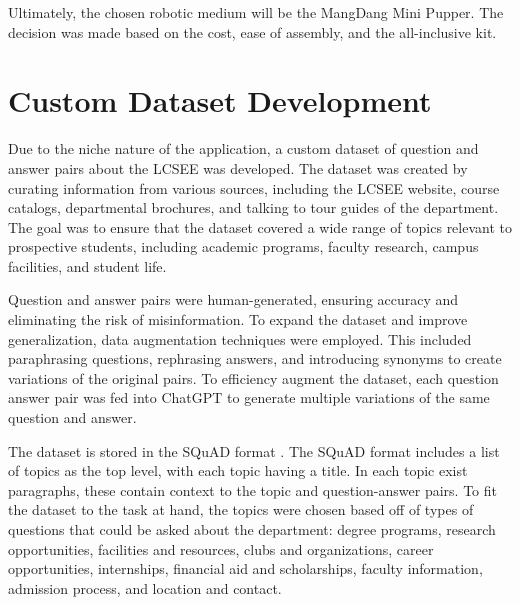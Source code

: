 \documentclass[conference]{IEEEtran}
\begin{document}
Ultimately, the chosen robotic medium will be the MangDang Mini Pupper. 
The decision was made based on the cost, ease of assembly, and the all-inclusive kit.

\section{Custom Dataset Development}
Due to the niche nature of the application, a custom dataset of question and answer pairs about the LCSEE was developed.
The dataset was created by curating information from various sources, including the LCSEE website, course catalogs, departmental brochures, and talking to tour guides of the department. 
The goal was to ensure that the dataset covered a wide range of topics relevant to prospective students, including academic programs, faculty research, campus facilities, and student life.

Question and answer pairs were human-generated, ensuring accuracy and eliminating the risk of misinformation.
To expand the dataset and improve generalization, data augmentation techniques were employed.
This included paraphrasing questions, rephrasing answers, and introducing synonyms to create variations of the original pairs.
To efficiency augment the dataset, each question answer pair was fed into ChatGPT to generate multiple variations of the same question and answer.

The dataset is stored in the SQuAD format \cite{b7}. 
The SQuAD format includes a list of topics as the top level, with each topic having a title. 
In each topic exist paragraphs, these contain context to the topic and question-answer pairs.
To fit the dataset to the task at hand, the topics were chosen based off of types of questions that could be asked about the department:
degree programs, research opportunities, facilities and resources, clubs and organizations, career opportunities, internships, financial aid and scholarships, faculty information, admission process, and location and contact.
\end{document}
